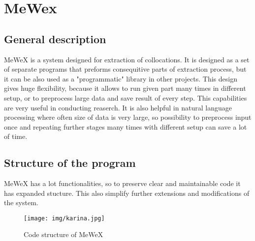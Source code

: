 \section{MeWex}

\subsection{General description}
MeWeX is a system designed for extraction of collocations. It is designed as a set of separate programs 
that preforms consequitive parts of extraction process, but it can be also used as a "programmatic" library in other projects. 
This design gives huge flexibility, because it allows to run given part many times in different setup, 
or to preprocess large data and save result of every step. This capabilities are very useful in conducting reaserch. 
It is also helpful in natural language processing where often size of data is very large, so possibility 
to preprocess input once and repeating further stages many times with different setup can save a lot of time.

\subsection{Structure of the program}
MeWeX has a lot functionalities, so to preserve clear and maintainable code it has expanded stucture. 
This also simplify further extensions and modifications of the system.

\begin{figure}[ht]
	\centering
	\texttt{[image: img/karina.jpg]}
	\caption{Code structure of MeWeX}
	\label{img_structure}
\end{figure}

